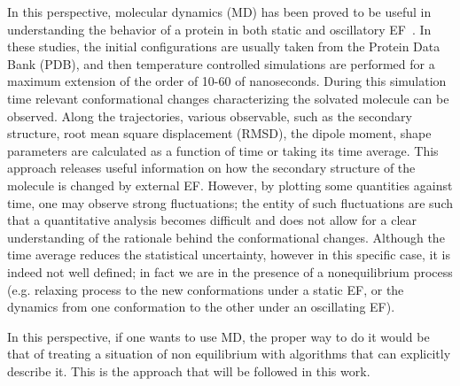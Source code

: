 \documentclass[a4paper,preprint,unsortedaddress,onecolumn]{revtex4-1}
\begin{document}
In this perspective, molecular dynamics (MD) has been proved to be useful in
understanding the behavior of a protein 
in both static and oscillatory EF~\cite{budi2005electric, budi2007effect, budi2008comparative,
  toschi2008effects, astrakas2011electric, astrakas2012structural,
  damm2012can, starzyk2013proteins, english2009nonequilibrium,
  solomentsev2012effects}. In these studies, the initial
configurations are usually taken from the Protein Data Bank (PDB),
and then temperature controlled simulations are performed for a maximum extension of the order of 10-60 of nanoseconds.
During this simulation time 
relevant conformational changes characterizing the solvated molecule can be observed. 
Along the trajectories, various observable, such as the
secondary structure, root mean square displacement (RMSD), the dipole
moment, shape parameters are calculated as a function of time or taking its time average. This approach releases useful information on how the
secondary structure of the molecule is changed by external  EF.  However,
by plotting some quantities against time, one may observe strong
fluctuations; the entity of such fluctuations are such that a quantitative 
analysis becomes difficult and does not allow for  a clear understanding of the rationale behind the conformational changes.
Although the time average reduces the statistical uncertainty,
however in this specific case, it is indeed not well defined;
in fact we are in the presence of a nonequilibrium process
(e.g. relaxing process to the new conformations under a static
EF, or the dynamics from one conformation to the other under an oscillating EF).

In this perspective, if one wants to use MD, the proper way to do it would be that of treating a situation of non equilibrium with algorithms that can explicitly describe it. This is the approach that will be followed in this work.
\end{document}
